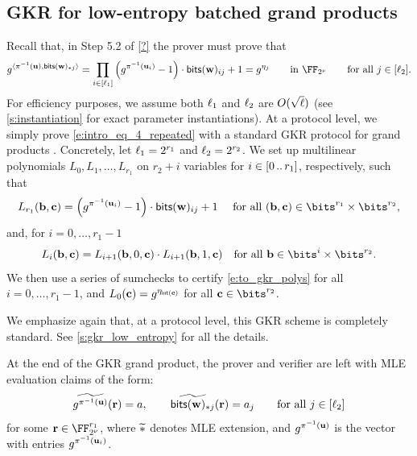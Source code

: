 \documentclass[11pt,letterpaper,usenames,dvipsnames]{article}
\begin{document}
\subsection{GKR for low-entropy batched grand products}
   Recall that, in Step 5.2 of \cref{?} the prover must prove that
          \begin{equation}\label{e:intro_eq_4_repeated}g^{\langle \pi^{-1}(\uu), \mathsf{bits}(\ww)_{*j}\rangle} = \prod_{i\in [\codedim_1]} \left(g^{\pi^{-1}(\uu_i)} -1\right)\cdot \mathsf{bits}(\ww)_{ij}  +1 =g^{\eta_j} \qquad \text{in  } \comfield \qquad \text{for all } j\in [\codedim_2].
        \end{equation} 
        For efficiency purposes, we assume  both $\ell_1$ and $\ell_2$ are $O(\sqrt{\ell})$ (see \cref{s:instantiation} for exact parameter instantiations).  At a protocol level, we simply prove \eqref{e:intro_eq_4_repeated} with a standard GKR protocol for grand products \cite{thaler?}. Concretely, let $\ell_1=2^{r_1}$ and $\ell_2=2^{r_2}$. We set up multilinear polynomials $L_{0}, L_1,\ldots, L_{r_1}$ on $r_2 + i$ variables for $i\in [0 \, .. \, r_1]$, respectively, such that 
        $$
        L_{r_1}(\bb,\cc) = \left(g^{\pi^{-1}(\uu_i)} -1\right)\cdot \mathsf{bits}(\ww)_{ij}  +1  \quad  \text{ for all } (\bb,\cc) \in \bits^{r_1} \times \bits^{r_2},
        $$
        and, for $i=0,\ldots, r_1-1$
      \begin{equation}\label{e:to_gkr_polys}
  L_{i}(\bb,\cc)  =  L_{i+1}(\bb,0,\cc) \cdot L_{i+1}(\bb,1, \cc)  \quad \text{for all } \bb\in \bits^{i} \times \bits^{r_2}.
    \end{equation}
    We then use a series of sumchecks to certify \cref{e:to_gkr_polys} for all $i=0,\ldots, r_1-1$, and $L_{0}(\mathbf{c}) = g^{\eta_{\mathsf{int}(\mathbf{c})}}$ for all $\cc\in \bits^{r_2}$.  
    
    We emphasize again that, at a protocol level, this GKR scheme is completely standard. See \cref{s:gkr_low_entropy} for all the details. 
    
    
    At the end of the GKR grand product, the prover and verifier are left with MLE evaluation claims of the form:
    \begin{equation}\label{e:intro_grand_product_eq_1}
    {\widetilde{g^{\pi^{-1}(\mathbf{u})}}}(\mathbf{r}) = a,\qquad {\widetilde{\mathsf{bits}(\mathbf{w})_{*j}}}(\mathbf{r})=a_j \qquad \text{for all } j \in [\ell_2]
    \end{equation}
    for some $\rr\in \comfield^{r_1}$, where ${\widetilde{*}}$ denotes MLE extension, and $g^{\pi^{-1}(\mathbf{u})}$ is the vector with entries $g^{\pi^{-1}(\mathbf{u}_i)}$. 
    
\end{document}
